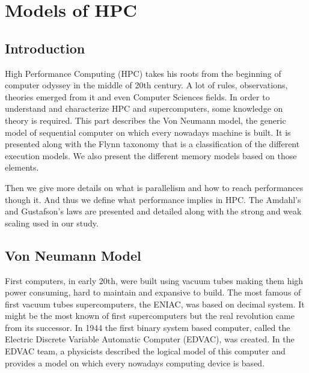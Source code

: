 
\chapter{Models of HPC}

\section{Introduction}

High Performance Computing (HPC) takes his roots from the beginning of computer odyssey in the middle of 20th century.
A lot of rules, observations, theories emerged from it and even Computer Sciences fields. 
In order to understand and characterize HPC and supercomputers, some knowledge on theory is required. 
This part describes the Von Neumann model, the generic model of sequential computer on which every nowadays machine is built.
It is presented along with the Flynn taxonomy that is a classification of the different execution models. 
We also present the different memory models based on those elements. 

Then we give more details on what is parallelism and how to reach performances though it. 
And thus we define what performance implies in HPC. 
The Amdahl's and Gustafson's laws are presented and detailed along with the strong and weak scaling used in our study. 

\section{Von Neumann Model}
First computers, in early 20th, were built using vacuum tubes making them high power consuming, hard to maintain and expansive to build.
The most famous of first vacuum tubes supercomputers, the ENIAC, was based on decimal system.
It might be the most known of first supercomputers but the real revolution came from its successor.
In 1944 the first binary system based computer, called the Electric Discrete Variable Automatic Computer (EDVAC), was created. 
In the EDVAC team, a physicists described the logical model of this computer and provides a model on which every nowadays computing device is based. 

